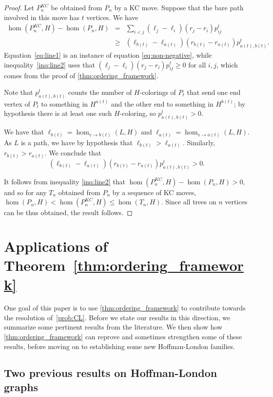 \documentclass[11pt]{article}
\theoremstyle{definition}
\newcommand{\homclass}[4]{\hom_{#1\to#2}(#3,#4)}
\begin{document}
\begin{proof}
Let $P^{KC}_n$ be obtained from $P_n$ by a KC move. Suppose that the bare path involved in this move has $t$ vertices. We have 
\begin{eqnarray}
\hom(P^{KC}_n,H) - \hom(P_n,H) & = & \sum_{i< j} (\ell_j-\ell_i)(r_j-r_i)p^t_{ij} \label{eq:line1}\\
& \ge & (\ell_{b(t)}-\ell_{a(t)})(r_{b(t)}-r_{a(t)})p^t_{a(t),b(t)}. \label{inq:line2}
\end{eqnarray}
Equation~\eqref{eq:line1} is an instance of equation \eqref{eq:non-negative}, while inequality~\eqref{inq:line2} uses that $(\ell_j-\ell_i)(r_j-r_i)p^t_{ij} \ge 0$ for all $i, j$, which comes from the proof of \cref{thm:ordering_framework}. 

Note that $p^t_{a(t),b(t)}$ counts the number of $H$-colorings of $P_t$ that send one end vertex of $P_t$ to something in $H^{a(t)}$ and the other end to something in $H^{b(t)}$; by hypothesis there is at least one such $H$-coloring, so $p^t_{a(t),b(t)} > 0$.

We have that $\ell_{b(t)} = \homclass{v}{b(t)}{L}{H}$ and $\ell_{a(t)} = \homclass{v}{a(t)}{L}{H}$. As $L$ is a path, we have by hypothesis that $\ell_{b(t)} > \ell_{a(t)}$. Similarly, $r_{b(t)} > r_{a(t)}$. We conclude that
\[(\ell_{b(t)}-\ell_{a(t)})(r_{b(t)}-r_{a(t)})p^t_{a(t),b(t)} > 0.\]

It follows from inequality \eqref{inq:line2} that $\hom(P^{KC}_n,H) - \hom(P_n,H) > 0$, and so for any $T_n$ obtained from $P_n$ by a sequence of KC moves, $\hom(P_n,H)<\hom(P_n^{KC},H)\le\hom(T_n,H)$. Since all trees on $n$ vertices can be thus obtained, the result follows. 
\end{proof}

\section{Applications of Theorem~\ref{thm:ordering_framework}} \label{sec:ordering_applications}

One goal of this paper is to use \cref{thm:ordering_framework} to contribute towards the resolution of~\cref{prob:CL}. Before we state our results in this direction, we summarize some pertinent results from the literature. We then show how \cref{thm:ordering_framework} can reprove and sometimes strengthen some of these results, before moving on to establishing some new Hoffman-London families.

\subsection{Two previous results on Hoffman-London graphs}
\end{document}
